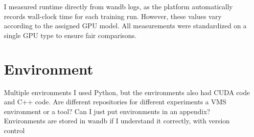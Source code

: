 I measured runtime directly from \acrshort{wandb} logs, as the platform automatically records wall-clock time for each training run. However, these values vary according to the assigned GPU model. All measurements were standardized on a single GPU type to ensure fair comparisons. 

\section{Environment} 

Multiple environments
I used Python, but the environments also had CUDA code and C++ code. 
Are different repositories for different experiments
a VMS environment or a tool?
Can I just put environments in an appendix? Environments are stored in wandb if I understand it correctly, with version control